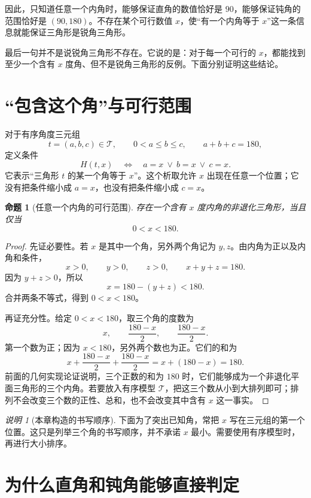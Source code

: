 \documentclass[UTF8,a4paper,zihao=-4,oneside,openany,fontset=fandol]{ctexbook}
\newtheorem{proposition}[theorem]{命题}
\theoremstyle{definition}
\theoremstyle{remark}
\newtheorem{remark}[theorem]{说明}
\begin{document}
因此，只知道任意一个内角时，能够保证直角的数值恰好是 $90$，能够保证钝角的范围恰好是 $(90,180)$。不存在某个可行数值 $x$，使“有一个内角等于 $x$”这一条信息就能保证三角形是锐角三角形。

最后一句并不是说锐角三角形不存在。它说的是：对于每一个可行的 $x$，都能找到至少一个含有 $x$ 度角、但不是锐角三角形的反例。下面分别证明这些结论。

\section{“包含这个角”与可行范围}

对于有序角度三元组
\[
t=(a,b,c)\in\mathcal T,
\qquad 0<a\le b\le c,\qquad a+b+c=180,
\]
定义条件
\[
H(t,x)\quad\Longleftrightarrow\quad
a=x\ \lor\ b=x\ \lor\ c=x.
\]
它表示“三角形 $t$ 的某一个角等于 $x$”。这个析取允许 $x$ 出现在任意一个位置；它没有把条件缩小成 $a=x$，也没有把条件缩小成 $c=x$。

\begin{proposition}[任意一个内角的可行范围]
\label{prop:any-angle-feasible}
存在一个含有 $x$ 度内角的非退化三角形，当且仅当
\[
0<x<180.
\]
\end{proposition}

\begin{proof}
先证必要性。若 $x$ 是其中一个角，另外两个角记为 $y,z$。由内角为正以及内角和条件，
\[
x>0,\qquad y>0,\qquad z>0,\qquad x+y+z=180.
\]
因为 $y+z>0$，所以
\[
x=180-(y+z)<180.
\]
合并两条不等式，得到 $0<x<180$。

再证充分性。给定 $0<x<180$，取三个角的度数为
\[
x,\qquad \frac{180-x}{2},\qquad \frac{180-x}{2}.
\]
第一个数为正；因为 $x<180$，另外两个数也为正。它们的和为
\[
x+\frac{180-x}{2}+\frac{180-x}{2}
=x+(180-x)=180.
\]
前面的几何实现论证说明，三个正数的和为 $180$ 时，它们能够成为一个非退化平面三角形的三个内角。若要放入有序模型 $\mathcal T$，把这三个数从小到大排列即可；排列不会改变三个数的正性、总和，也不会改变其中含有 $x$ 这一事实。
\end{proof}

\begin{remark}[本章构造的书写顺序]
下面为了突出已知角，常把 $x$ 写在三元组的第一个位置。这只是列举三个角的书写顺序，并不承诺 $x$ 最小。需要使用有序模型时，再进行大小排序。
\end{remark}

\section{为什么直角和钝角能够直接判定}
\end{document}
